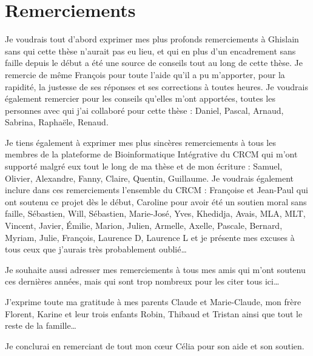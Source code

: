 \chapter*{Remerciements}

\noindent{}Je voudrais tout d'abord exprimer mes plus profonds remerciements à Ghislain sans qui cette thèse n'aurait pas eu lieu, et qui en plus d'un encadrement sans faille depuis le début a été une source de conseils tout au long de cette thèse. Je remercie de même François pour toute l'aide qu'il a pu m'apporter, pour la rapidité, la justesse de ses réponses et ses corrections à toutes heures. Je voudrais également remercier pour les conseils qu'elles m'ont apportées, toutes les personnes avec qui j'ai collaboré pour cette thèse : Daniel, Pascal, Arnaud, Sabrina, Raphaële, Renaud.
\vspace{.5cm}

\noindent{}Je tiens également à exprimer mes plus sincères remerciements à tous les membres de la plateforme de Bioinformatique Intégrative du \acs{CRCM} qui m'ont supporté malgré eux tout le long de ma thèse et de mon écriture : Samuel, Olivier, Alexandre, Fanny, Claire, Quentin, Guillaume. Je voudrais également inclure dans ces remerciements l'ensemble du CRCM : Françoise et Jean-Paul qui ont soutenu ce projet dès le début, Caroline pour avoir été un soutien moral sans faille, Sébastien, Will, Sébastien, Marie-José, Yves, Khedidja, Avais, MLA, MLT, Vincent, Javier, Émilie, Marion, Julien, Armelle, Axelle, Pascale, Bernard, Myriam, Julie, François, Laurence D, Laurence L et je présente mes excuses à tous ceux que j'aurais très probablement oublié\dots
\vspace{.5cm}

\noindent{}Je souhaite aussi adresser mes remerciements à tous mes amis qui m'ont soutenu ces dernières années, mais qui sont trop nombreux pour les citer tous ici\dots
\vspace{.5cm}

\noindent{}J'exprime toute ma gratitude à mes parents Claude et Marie-Claude, mon frère Florent, Karine et leur trois enfants Robin, Thibaud et Tristan ainsi que tout le reste de la famille\dots
\vspace{.5cm}

\noindent{}Je conclurai en remerciant de tout mon c{\oe}ur Célia pour son aide et son soutien.
